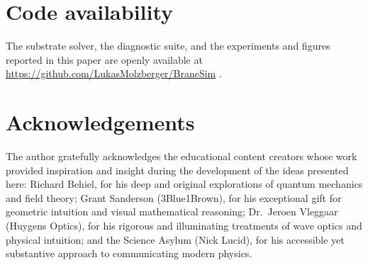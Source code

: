 \section*{Code availability}

The substrate solver, the diagnostic suite, and the experiments and figures
reported in this paper are openly available at
\url{https://github.com/LukasMolzberger/BraneSim} \citep{BraneSimRepo}.

\section*{Acknowledgements}

The author gratefully acknowledges the educational content creators whose work provided inspiration and insight during the development of the ideas presented here: Richard Behiel, for his deep and original explorations of quantum mechanics and field theory; Grant Sanderson (3Blue1Brown), for his exceptional gift for geometric intuition and visual mathematical reasoning; Dr.\ Jeroen Vleggaar (Huygens Optics), for his rigorous and illuminating treatments of wave optics and physical intuition; and the Science Asylum (Nick Lucid), for his accessible yet substantive approach to communicating modern physics.